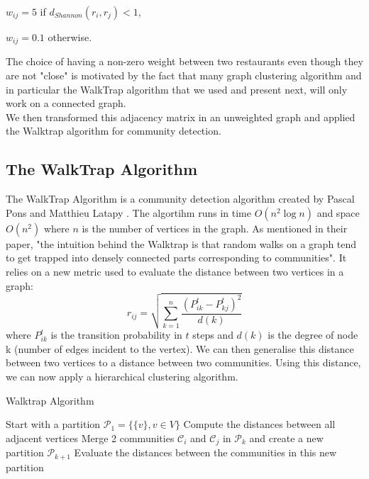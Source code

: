 \documentclass[twoside]{article}
\begin{document}
\begin{multicols}{2}
\begin{compactitem}
\item $w_{ij} = 5$ if $d_{Shannon}(r_i,r_j)<1$,
\item $w_{ij} = 0.1$ otherwise.\\
\end{compactitem}

\noindent The choice of having a non-zero weight between two restaurants even though they are not "close" is motivated by the fact that many graph clustering algorithm and in particular the WalkTrap algorithm that we used and present next, will only work on a connected graph.\\

\noindent We then transformed this adjacency matrix in an unweighted graph and applied the Walktrap algorithm for community detection.\\

\subsection{The WalkTrap Algorithm}
The WalkTrap Algorithm is a community detection algorithm created by Pascal Pons and Matthieu Latapy \cite{Gr}. The algortihm runs in time $O(n^2\log n)$ and space $O(n^2)$ where $n$ is the number of vertices in the graph. As mentioned in their paper, "the intuition behind the Walktrap is that random walks on a graph tend to get trapped into densely connected parts corresponding to communities".\cite{Gr} It relies on a new metric used to evaluate the distance between two vertices in a graph:
 $$r_{ij} = \sqrt{\sum\limits_{k=1}^{n}\frac{(P^t_{ik}-P^t_{kj})^2}{d(k)}}$$
 where $P^t_{ik}$ is the transition probability in $t$ steps and $d(k)$ is the degree of node k (number of edges incident to the vertex). We can then generalise this distance between two vertices to a distance between two communities. Using this distance, we can now apply a hierarchical clustering algorithm.

\begin{algorithm}[H]
\caption{Walktrap Algorithm}\label{euclid}
\begin{algorithmic}[1]
\State Start with a partition $\mathcal{P}_1=\{\{v\}, v \in V\}$
\State Compute the distances between all adjacent vertices
\State Merge 2 communities $\mathcal{C}_i$ and $\mathcal{C}_j$ in $\mathcal{P}_k$ and create a new partition $\mathcal{P}_{k+1}$
\State Evaluate the distances between the communities in this new partition
\EndWhile
\end{algorithmic}
\end{algorithm}


\end{multicols}
\end{document}
